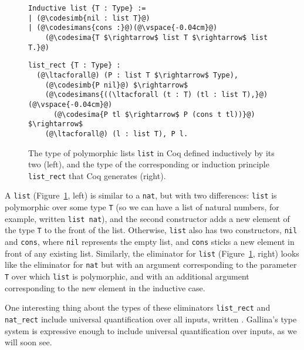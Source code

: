 \begin{figure}
\begin{minipage}{0.44\textwidth}
\begin{lstlisting}
Inductive list {T : Type} :=
| (@\codesimb{nil : list T}@)
| (@\codesimans{cons :}@)(@\vspace{-0.04cm}@)
    (@\codesima{T $\rightarrow$ list T $\rightarrow$ list T.}@)
\end{lstlisting}
\end{minipage}
\hfill
\begin{minipage}{0.55\textwidth}
\begin{lstlisting}
list_rect {T : Type} :
  (@\ltacforall@) (P : list T $\rightarrow$ Type),
    (@\codesimb{P nil}@) $\rightarrow$
    (@\codesimans{((\ltacforall (t : T) (tl : list T),}@)(@\vspace{-0.04cm}@)
      (@\codesima{P tl $\rightarrow$ P (cons t tl))}@) $\rightarrow$
    (@\ltacforall@) (l : list T), P l.
\end{lstlisting}
\end{minipage}
\caption{The type of polymorphic lists \lstinline{list} in Coq defined inductively by its two  (left), and the type of the corresponding  or induction principle \lstinline{list_rect} that Coq generates (right).}
\label{fig:list}
\end{figure}


A \lstinline{list} (Figure~\ref{fig:list}, left) is similar to a \lstinline{nat}, 
but with two differences: \lstinline{list} is polymorphic over some type \lstinline{T} (so we can have a list of natural numbers,
for example, written \lstinline{list nat}), and the second constructor adds a new element of the type \lstinline{T} to the front of the list.
Otherwise, \lstinline{list} also has two constructors, \lstinline{nil} and \lstinline{cons}, where \lstinline{nil} represents the empty list,
and \lstinline{cons} sticks a new element in front of any existing list.
Similarly, the eliminator for \lstinline{list} (Figure~\ref{fig:list}, right) looks like the eliminator for \lstinline{nat} 
but with an argument corresponding to the parameter \lstinline{T} over which \lstinline{list} is polymorphic,
and with an additional argument corresponding to the new element in the inductive case.

One interesting thing about the types of these eliminators \lstinline{list_rect} and \lstinline{nat_rect}
include universal quantification over all inputs, written \ltacforall.
Gallina's type system is expressive enough to include universal quantification over inputs, as we will soon see.

